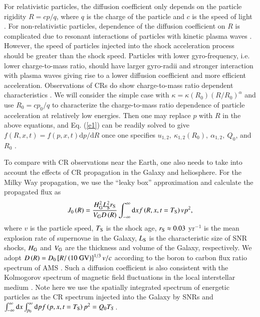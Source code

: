 \documentclass[apj]{emulateapj}
\begin{document}
For relativistic particles, the diffusion coefficient only depends on the particle rigidity $ R=cp/q $, where $ q $ is the charge of the particle and $ c $ is the speed of light \citep{PhysRevLett.108.081104}.  
For non-relativistic particles, dependence of the diffusion coefficient on $ R $ is complicated due to resonant interactions of particles with kinetic plasma waves \citep{2004ApJ...610..550P}. However, the speed of particles injected into the shock acceleration process should be greater than the shock speed. Particles with lower gyro-frequency, i.e. lower charge-to-mass ratio, should have larger gyro-radii and stronger interaction with plasma waves giving rise to a lower diffusion coefficient \citep{2006ApJ...636..462L} and more efficient acceleration. Observations of CRs do show charge-to-mass ratio dependent characteristics \citep{2008APh....30..133A, 2011ApJ...728..122Y}. We will consider the simple case with $ \kappa=\kappa\left( R_0\right) \left( R/R_0\right) ^\alpha $ and use $ R_0=cp_0/q $ to characterize the charge-to-mass ratio dependence of particle acceleration at relatively low energies. 
Then one may replace $ p $ with $ R $ in the above equations, and Eq. (\ref{e1}) can be readily solved to give $ f\left( R,x,t\right) =f\left( p,x,t\right) {\textrm{d}p}/{\textrm{d}R} $ once one specifies $ u_{1,2},\ \kappa_{1,2}\left( R_0\right) ,\ \alpha_{1,2},\ Q_0 $, and $R_0$ \citep{1991MNRAS.251..340D}. 

To compare with CR observations near the Earth, one also needs to take into account the effects of CR propagation in the Galaxy and heliosphere. For the Milky Way propagation, we use the ``leaky box'' approximation and calculate the propagated flux as
\begin{equation}
J_0\left( R\right) =\frac{H_\textrm{\scriptsize G}^2L_\textrm{\scriptsize S}^2r_\textrm{\scriptsize S}}{V_\textrm{\scriptsize G}D\left( R\right)}
\int_{-\infty}^\infty {\rm d} x f\left( R,x,{t=T_{\textrm{\scriptsize S}}}\right) vp^2,
\end{equation}
where $v$ is the particle speed, $T_\textrm{\scriptsize S}$ is the shock age, $r_\textrm{\scriptsize S}\approx0.03$ yr$^{-1}$ is the mean explosion rate of supernovae in the Galaxy, $L_\textrm{\scriptsize S}$ is the characteristic size of SNR shocks, $H_\textrm{\scriptsize G}$ and $V_\textrm{\scriptsize G}$ are the thickness and volume of the Galaxy, respectively. We adopt $D\left( R\right) =D_0\left[ R/\left( 10\ {\rm GV}\right) \right] ^{1/3}v/c $ according to the boron to carbon flux ratio spectrum of AMS \citep{2016PhRvL.117w1102A}. Such a diffusion coefficient is also consistent with the Kolmogorov spectrum of magnetic field fluctuations in the local interstellar medium \citep{2015ApJ...804L..31B}. Note here we use the spatially integrated spectrum of energetic particles as the CR spectrum injected into the Galaxy by SNRs and $\int_{-\infty}^\infty {\rm d} x \int^\infty_{p_0} {\rm d} p f\left( p,x,{t=T_{\textrm{\scriptsize S}}}\right) p^2=Q_0T_S$.
\end{document}
